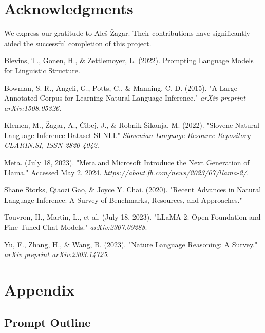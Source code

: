 \documentclass[fleqn,moreauthors,10pt]{ds_report}
\begin{document}

\section*{Acknowledgments}

We express our gratitude to Aleš Žagar. Their contributions have significantly aided the successful completion of this project.




Blevins, T., Gonen, H., \& Zettlemoyer, L. (2022). Prompting Language Models for Linguistic Structure.

Bowman, S. R., Angeli, G., Potts, C., \& Manning, C. D. (2015). "A Large Annotated Corpus for Learning Natural Language Inference." \textit{arXiv preprint arXiv:1508.05326}.

Klemen, M., Žagar, A., Čibej, J., \& Robnik-Šikonja, M. (2022). "Slovene Natural Language Inference Dataset SI-NLI." \textit{Slovenian Language Resource Repository CLARIN.SI, ISSN 2820-4042}.

Meta. (July 18, 2023). "Meta and Microsoft Introduce the Next Generation of Llama." Accessed May 2, 2024. \allowbreak \textit{https://about.fb.com/news/2023/07/llama-2/}.

Shane Storks, Qiaozi Gao, \& Joyce Y. Chai. (2020). "Recent Advances in Natural Language Inference: A Survey of Benchmarks, Resources, and Approaches."

Touvron, H., Martin, L., et al. (July 18, 2023). "LLaMA-2: Open Foundation and Fine-Tuned Chat Models." \textit{arXiv:2307.09288}.

Yu, F., Zhang, H., \& Wang, B. (2023). "Nature Language Reasoning: A Survey." \textit{arXiv preprint arXiv:2303.14725}.
\vspace{\baselineskip}

\section*{Appendix}

\subsection{Prompt Outline}
\end{document}
